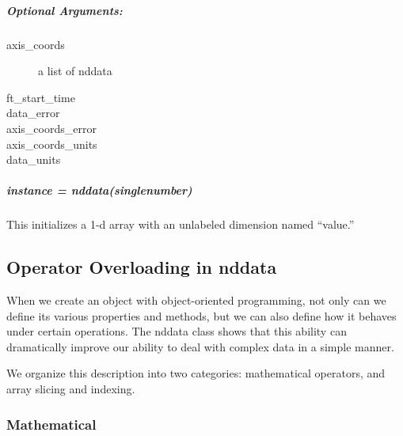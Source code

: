 \subparagraph{Optional Arguments:}
\begin{mykwargs}
    \begin{description}
        \item[axis\_coords] a list of nddata 
        \item[ft\_start\_time]
        \item[data\_error]
        \item[axis\_coords\_error]
        \item[axis\_coords\_units]  
        \item[data\_units]  
    \end{description}
\end{mykwargs}
\subparagraph{instance = nddata(singlenumber)}
This initializes a 1-d array with an unlabeled dimension named ``value.''
\subsection{Operator Overloading in nddata}
When we create an object with object-oriented programming,
    not only can we define its various properties and methods,
    but we can also define how it behaves under certain operations.
The nddata class shows that this ability can dramatically improve
    our ability to deal with complex data in a simple manner.

We organize this description into two categories: mathematical operators,
    and array slicing and indexing.
\subsubsection{Mathematical}
